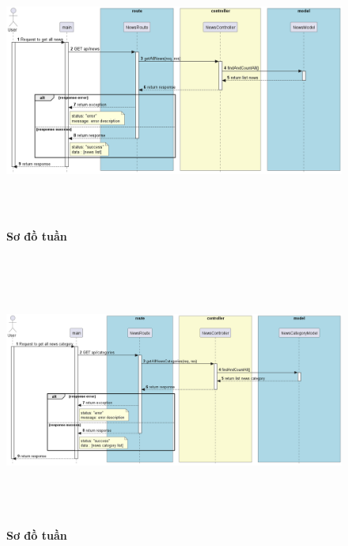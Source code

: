 \begin{figure}[H]
  \centering
  \includegraphics[width=16cm,height=9cm]{Images/server/sequence/server/getAllNews.png}
  \caption[Sơ đồ tuần tự ]{\bfseries \fontsize{12pt}{0pt}
  \selectfont Sơ đồ tuần }
  \label{hinh21} %
\end{figure}

\begin{figure}[H]
  \centering
  \includegraphics[width=16cm,height=9cm]{Images/server/sequence/server/getAllNewsCategories.png}
  \caption[Sơ đồ tuần tự ]{\bfseries \fontsize{12pt}{0pt}
  \selectfont Sơ đồ tuần }
  \label{hinh21} %
\end{figure}


